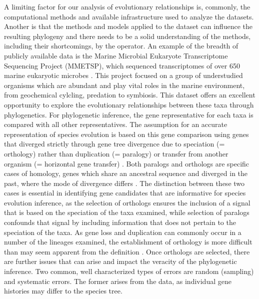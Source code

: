 \documentclass[12pt]{article}
\begin{document}
A limiting factor for our analysis of evolutionary relationships is, commonly, the computational methods and available infrastructure used to analyze the datasets. 
Another is that the methods and models applied to the dataset can influence the resulting phylogeny and there needs to be a solid understanding of the methods, including their shortcomings, by the operator.
An example of the breadth of publicly available data is the Marine Microbial Eukaryote Transcriptome Sequencing Project (MMETSP), which sequenced transcriptomes of over 650 marine eukaryotic microbes \cite{keeling2014marine}. 
This project focused on a group of understudied organisms which are abundant and play vital roles in the marine environment, from geochemical cylcling, predation to symbiosis. %
This dataset offers an excellent opportunity to explore the evolutionary relationships between these taxa through phylogenetics. 
For phylogenetic inference, the gene representative for each taxa is compared with all other representatives. 
The assumption for an accurate representation of species evolution is based on this gene comparison using genes that diverged strictly through  gene tree divergence due to speciation (= orthology) rather than duplication (= paralogy) or transfer from another organism (= horizontal gene transfer) \cite{maddison1997gene}. 
Both paralogs and orthologs are specific cases of homology, genes which share an ancestral sequence and diverged in the past, where the mode of divergence differs \cite{fitch1970distinguishing}. 
The distinction between these two cases is essential in identifying gene candidates that are informative for species evolution inference, as the selection of orthologs ensures the inclusion of a signal that is based on the speciation of the taxa examined, while selection of paralogs confounds that signal by including information that does not pertain to the speciation of the taxa. 
As gene loss and duplication can commonly occur in a number of the lineages examined, the establishment of orthology is more difficult than may seem apparent from the definition \cite{gabaldon2008large}. 
Once orthologs are selected, there are further issues that can arise and impact the veracity of the phylogenetic inference. 
Two common, well characterized types of errors are random (sampling) and systematic errors. 
The former arises from the data, as individual gene histories may differ to the species tree. 
\end{document}
